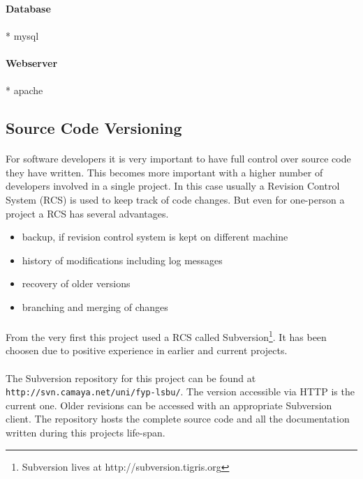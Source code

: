 \paragraph{Database}
\paragraph{}
* mysql
\paragraph{Webserver}
\paragraph{}
* apache



\subsection{Source Code Versioning}
\paragraph{}
For software developers it is very important to have full control over source code they have written. This becomes more important with a higher number of developers involved in a single project. In this case usually a Revision Control System (RCS) is used to keep track of code changes. But even for one-person a project a RCS has several advantages.

\begin{itemize}
\item backup, if revision control system is kept on different machine
\item history of modifications including log messages
\item recovery of older versions
\item branching and merging of changes
\end{itemize}

\paragraph{}
From the very first this project used a RCS called Subversion\footnote{Subversion lives at http://subversion.tigris.org}. It has been choosen due to positive experience in earlier and current projects.

\paragraph{}
The Subversion repository for this project can be found at \texttt{http://svn.camaya.net/uni/fyp-lsbu/}. The version accessible via HTTP is the current one. Older revisions can be accessed with an appropriate Subversion client. The repository hosts the complete source code and all the documentation written during this projects life-span.


